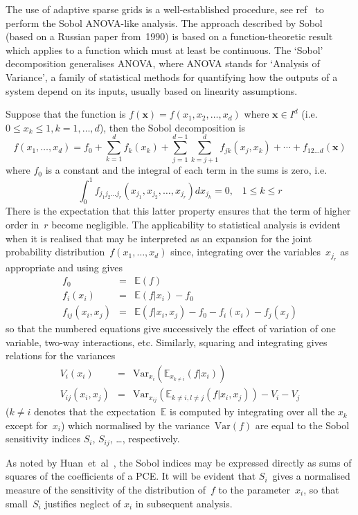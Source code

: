 The use of adaptive sparse grids is a well-established procedure, see ref~\cite{He03Adap}
to perform the Sobol ANOVA-like analysis.
The approach described by Sobol~\cite{So01Glob} (based on a Russian paper from~1990)
is based on a function-theoretic result which applies
to a function which must at least be continuous.
The `Sobol' decomposition generalises ANOVA, where ANOVA stands for `Analysis
of Variance', a family of statistical methods for quantifying how the outputs
of a system depend on its inputs, usually based on linearity assumptions.

Suppose that the function is $f\left(\mathbf{x}\right)=f\left(x_1,x_2,\dots,x_d\right)$
where ${\mathbf x} \in I^d$ (i.e.\ $0 \leq x_k \leq 1, k=1, \dots, d$), then the Sobol decomposition is
\begin{equation}\label{eq:fexp}
f\left(x_1,\ldots,x_d\right)=f_0+\sum_{k=1}^d f_k\left(x_k\right)+\sum_{j=1}^{d-1}\sum_{k=j+1}^d f_{jk}\left(x_j,x_k\right)+ \cdots +f_{12 \dots d}({\mathbf x})
\end{equation}
where $f_0$ is a constant and the integral of each term in the sums is zero, i.e.
\begin{equation}\label{eq:fint}
\int_0^1 f_{j_1 j_2 \dots j_r}\left(x_{j_1},x_{j_2},\dots,x_{j_r}\right)dx_{j_k}=0, \;\;\; 1 \leq k \leq r
\end{equation}
There is the expectation that this latter property ensures that the
term of higher order in~$r$ become negligible. The applicability to statistical
analysis is evident when it is realised that   may be interpreted as an expansion for the joint
probability distribution~$f\left(x_1,\ldots,x_d\right)$
since, integrating over the variables~$x_{j_r}$ as appropriate and using  gives
\begin{eqnarray}\label{eq:effe}
f_0&=&\mathbb{E}(f) \nonumber \\
f_i(x_i)&=&\mathbb{E}(f|x_i)-f_0 \label{eq:effe1}\\
f_{ij}(x_i,x_j)&=&\mathbb{E}(f|x_i,x_j)-f_0-f_i(x_i)-f_j(x_j) \label{eq:effe2}
\end{eqnarray}
so that the numbered equations give successively the effect of variation of one variable,
two-way interactions, etc. Similarly, squaring  and integrating gives
relations for the variances
\begin{eqnarray}\label{eq:sens}
V_i(x_i)&=&\mathrm{Var}_{x_i}\left(\mathbb{E}_{x_{k\neq i}}(f|x_i)\right) \\
V_{ij}(x_i,x_j)&=&\mathrm{Var}_{x_{ij}}\left(\mathbb{E}_{k\neq i, l\neq j}(f|x_i,x_j)\right)-V_i-V_j  \label{eq:sens2}
\end{eqnarray}
($k\neq i$ denotes that the expectation~$\mathbb{E}$ is computed by integrating over all the $x_k$ except for~$x_i$)
which normalised by the variance~$\mathrm{Var}(f)$ are equal to the Sobol sensitivity indices
$S_i$, $S_{ij}$, \ldots, respectively.

As noted by Huan~et~al~\cite[\S\,3.2]{Hu18Glob}, the Sobol indices may be expressed directly as sums of
squares of the coefficients of a PCE. It will be evident that $S_i$~gives a normalised measure
of the sensitivity of the distribution of~$f$ to the parameter~$x_i$, so that small~$S_i$
justifies neglect of $x_i$ in subsequent analysis.
